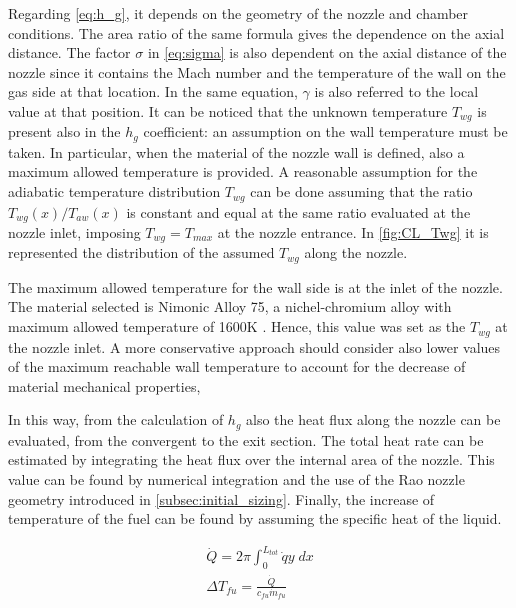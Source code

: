 \vspace{3mm}
Regarding \autoref{eq:h_g}, it depends on the geometry of the nozzle and chamber conditions. The area ratio of the same formula gives the dependence on the axial distance. The factor $\sigma$ in \autoref{eq:sigma} is also dependent on the axial distance of the nozzle since it contains the Mach number and the temperature of the wall on the gas side at that location. In the same equation, $\gamma$ is also referred to the local value at that position. It can be noticed that the unknown temperature $T_{wg}$ is present also in the $h_g$ coefficient: an assumption on the wall temperature must be taken. In particular, when the material of the nozzle wall is defined, also a maximum allowed temperature is provided. A reasonable assumption for the adiabatic temperature distribution  $T_{wg}$ can be done assuming that the ratio  $T_{wg} (x) / T_{aw} (x)$ is constant and equal at the same ratio evaluated at the nozzle inlet, imposing $T_{wg} = T_{max}$ at the nozzle entrance.
In \autoref{fig:CL_Twg} it is represented the distribution of the assumed $T_{wg}$ along the nozzle.


The maximum allowed temperature for the wall side is at the inlet of the nozzle. The material selected is Nimonic Alloy 75, a nichel-chromium alloy with maximum allowed temperature of 1600K \cite{nimonic}. Hence, this value was set as the $T_{wg}$ at the nozzle inlet. A more conservative approach should consider also lower values of the maximum reachable wall temperature to account for the decrease of material mechanical properties,

In this way, from the calculation of $h_g$ also the heat flux along the nozzle can be evaluated, from the convergent to the exit section.
The total heat rate can be estimated by integrating the heat flux over the internal area of the nozzle. This value can be found by numerical integration and the use of the Rao nozzle geometry introduced in \autoref{subsec:initial_sizing}. Finally, the increase of temperature of the fuel can be found by assuming the specific heat of the liquid.

\begin{gather}
    \dot{Q} = 2 \pi \int_{0}^{L_{tot}} \dot{q} y \; dx
    \\
    \Delta T_{fu} = \frac{\dot{Q}}{c_{fu} \dot{m}_{fu}}
\end{gather}

